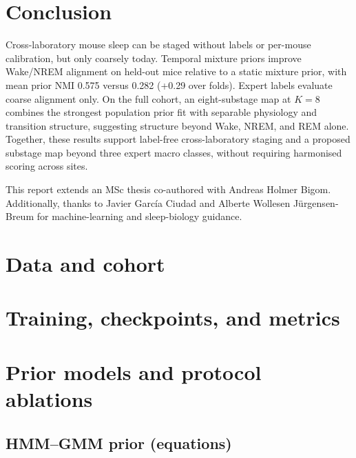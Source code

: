 \documentclass[10pt,letterpaper]{article}
\newif\ifreportmode
\newif\ifreportmode
\newcommand{\papersection}[1]{\section{#1}}
\newcommand{\paperacksection}{%
    \vspace{1.75em}%
    \par\noindent{\normalfont\normalsize\scshape Acknowledgments}\par\vspace{0.85em}%
  }
\newcommand{\paperreferences}{%
    \vspace{1.25em}%
  }
\newcommand{\papersection}[1]{\section*{#1}}
\newcommand{\paperacksection}{\section*{Acknowledgments}}
\newcommand{\paperreferences}{}
\begin{document}
\papersection{Conclusion}

Cross-laboratory mouse sleep can be staged without labels or per-mouse calibration, but only coarsely today. Temporal mixture priors improve Wake/NREM alignment on held-out mice relative to a static mixture prior, with mean prior NMI 0.575 versus 0.282 (+0.29 over folds). Expert labels evaluate coarse alignment only. On the full cohort, an eight-substage map at $K{=}8$ combines the strongest population prior fit with separable physiology and transition structure, suggesting structure beyond Wake, NREM, and REM alone. Together, these results support label-free cross-laboratory staging and a proposed substage map beyond three expert macro classes, without requiring harmonised scoring across sites.

\ifreportmode\else\nolinenumbers\fi
\paperacksection
\noindent This report extends an MSc thesis co-authored with Andreas Holmer Bigom. Additionally, thanks to Javier Garc\'ia Ciudad and Alberte Wollesen J\"urgensen-Breum for machine-learning and sleep-biology guidance.

\paperreferences

\clearpage
\appendix
\justifying

\section{Data and cohort}
\label{app:data}


\section{Training, checkpoints, and metrics}
\label{app:methods}


\section{Prior models and protocol ablations}
\label{app:ablations}

\subsection{HMM--GMM prior (equations)}
\label{app:ablations:hmm}
\end{document}

